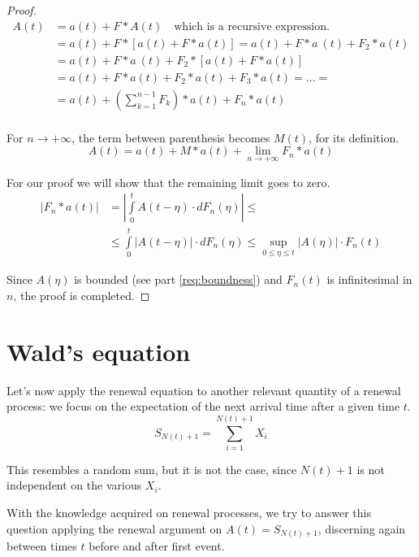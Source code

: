 \begin{proof}
	\begin{equation}\begin{split}
		A(t) &= a(t) + F \ast A(t) \quad \text{which is a recursive expression.} \\
		&= a(t) + F \ast \left[a(t) + F \ast a(t) \right] = a(t) + F \ast a ~ (t) + F_2 \ast a(t) \\
		&= a(t) + F \ast a ~ (t) + F_2 \ast \left[a(t) + F \ast a(t) \right] \\
		&= a(t) + F \ast a(t) + F_2 \ast a(t) + F_3 \ast a(t) = \dots  = \\
		&= a(t) + \left( \sum\limits_{k=1}^{n-1}F_k\right) \ast a(t) + F_n \ast a(t) \\
	\end{split} \end{equation}

	For $n \to +\infty$, the term between parenthesis becomes $M(t)$, for its definition.
	\begin{equation}
		A(t) = a(t) + M \ast a(t) + \lim_{n \to +\infty} F_n \ast a(t)
	\end{equation}

	For our proof we will show that the remaining limit goes to zero.
	\begin{equation} \begin{split}
		|F_n \ast a(t)| & = \left| \int\limits_0^{t}A(t-\eta) \cdot dF_n(\eta) \right| \le \\
		& \le \int\limits_0^{t}|A(t-\eta)| \cdot dF_n(\eta) \le \sup\limits_{0 \le \eta \le t} |A(\eta)| \cdot F_n (t)
	\end{split}\end{equation}

	Since $A(\eta)$ is bounded (see part \ref{req:boundness}) and $F_n(t)$ is infinitesimal in $n$, the proof is completed.
\end{proof}

\section{Wald's equation}

Let's now apply the renewal equation to another relevant quantity of a renewal process: we focus on the expectation of the next arrival time after a given time $t$.
	$$ S_{N(t) + 1} = \sum\limits_{i=1}^{N(t)+1}X_i $$

This resembles a random sum, but it is not the case, since $N(t) + 1$ is not independent on the various $X_i$.

With the knowledge acquired on renewal processes, we try to answer this question applying the renewal argument on $ A(t) = S_{N(t)+1} $, discerning again between times $t$ before and after first event.

